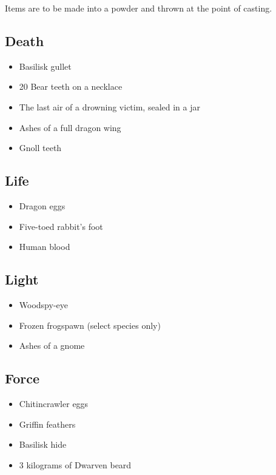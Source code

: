 \begin{multicols}{2}

Items are to be made into a powder and thrown at the point of casting.

\subsection{Death}

\begin{itemize}
  \item
  Basilisk gullet
  \item
  20 Bear teeth on a necklace
  \item
  The last air of a drowning victim, sealed in a jar
  \item
  Ashes of a full dragon wing
  \item
  Gnoll teeth
\end{itemize}

\subsection{Life}

\begin{itemize}
  \item
  Dragon eggs
  \item
  Five-toed rabbit's foot
  \item
  Human blood
\end{itemize}

\subsection{Light}

\begin{itemize}
  \item
  Woodspy-eye
  \item
  Frozen frogspawn (select species only)
  \item
  Ashes of a gnome
\end{itemize}

\subsection{Force}

\begin{itemize}
  \item
  Chitincrawler eggs
  \item
  Griffin feathers
  \item
  Basilisk hide
  \item
  3 kilograms of Dwarven beard
\end{itemize}


\end{multicols}
